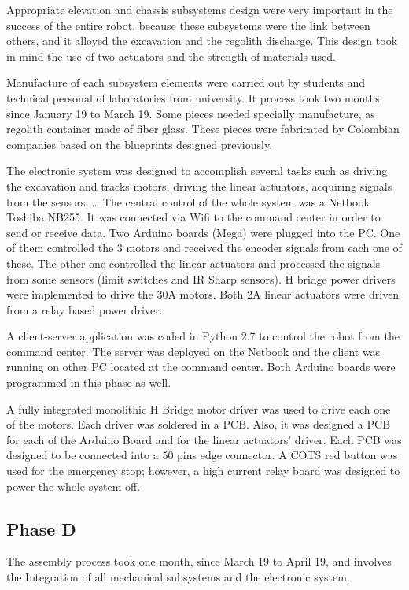 \documentclass[conference]{IEEEtran}
\begin{document}
Appropriate elevation and chassis subsystems design were very important in the success of the entire robot, because these subsystems were the link between others, and it alloyed the excavation and the regolith discharge.  This design took in mind the use of two actuators and the strength of materials used.

Manufacture of each subsystem elements were carried out by students and technical personal of laboratories from university. It process took two months since January 19 to March 19. Some pieces needed specially manufacture, as regolith container made of fiber glass. These pieces were fabricated by Colombian companies based on the blueprints designed previously.


The electronic system was designed to accomplish several tasks such as driving the excavation and tracks motors, driving the linear actuators, acquiring signals from the sensors, … The central control of the whole system was a Netbook Toshiba NB255. It was connected via Wifi to the command center in order to send or receive data. Two Arduino boards (Mega) were plugged into the PC. One of them controlled the 3 motors and received the encoder signals from each one of these. The other one controlled the linear actuators and processed the signals from some sensors (limit switches and IR Sharp sensors). H bridge power drivers were implemented to drive the 30A motors. Both 2A linear actuators were driven from a relay based power driver. 


A client-server application was coded in Python 2.7 to control the robot from the command center. The server was deployed on the Netbook and the client was running on other PC located at the command center. Both Arduino boards were programmed in this phase as well. 

A fully integrated monolithic H Bridge motor driver was used to drive each one of the motors. Each driver was soldered in a PCB. Also, it was designed a PCB for each of the Arduino Board and for the linear actuators’ driver. Each PCB was designed to be connected into a 50 pins edge connector. A COTS red button was used for the emergency stop; however, a high current relay board was designed to power the whole system off.


\subsection{Phase D}
The assembly process took one month, since March 19 to April 19, and involves the Integration of all mechanical subsystems and the electronic system.
\end{document}
